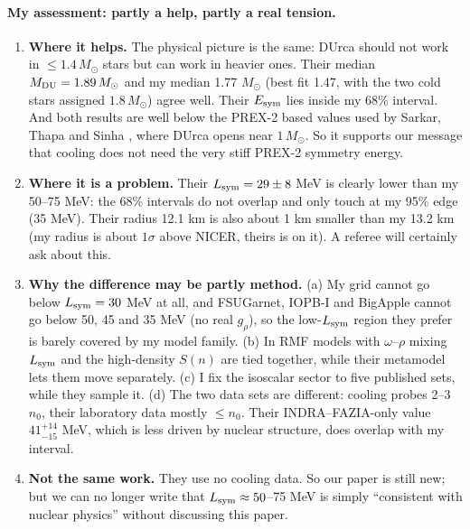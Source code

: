 \documentclass[11pt,a4paper]{article}
\newcommand{\Esym}{E_{\rm sym}}
\newcommand{\Lsym}{L_{\rm sym}}
\newcommand{\Msun}{M_\odot}
\begin{document}
\paragraph{My assessment: partly a help, partly a real tension.}
\begin{enumerate}
\item \textbf{Where it helps.} The physical picture is the same: DUrca should not work in $\le1.4\,\Msun$ stars but can work in heavier ones. Their median $M_{\rm DU}=1.89\,\Msun$ and my median 1.77 $\Msun$ (best fit 1.47, with the two cold stars assigned $1.8\,\Msun$) agree well. Their $\Esym$ lies inside my 68\% interval. And both results are well below the PREX-2 based values used by Sarkar, Thapa and Sinha \cite{Sarkar2023}, where DUrca opens near $1\,\Msun$. So it supports our message that cooling does not need the very stiff PREX-2 symmetry energy.
\item \textbf{Where it is a problem.} Their $\Lsym=29\pm8$ MeV is clearly lower than my 50--75 MeV: the 68\% intervals do not overlap and only touch at my 95\% edge (35 MeV). Their radius 12.1 km is also about 1 km smaller than my 13.2 km (my radius is about $1\sigma$ above NICER, theirs is on it). A referee will certainly ask about this.
\item \textbf{Why the difference may be partly method.} (a) My grid cannot go below $\Lsym=30$ MeV at all, and FSUGarnet, IOPB-I and BigApple cannot go below 50, 45 and 35 MeV (no real $g_\rho$), so the low-$\Lsym$ region they prefer is barely covered by my model family. (b) In RMF models with $\omega$--$\rho$ mixing $\Lsym$ and the high-density $S(n)$ are tied together, while their metamodel lets them move separately. (c) I fix the isoscalar sector to five published sets, while they sample it. (d) The two data sets are different: cooling probes 2--3 $n_0$, their laboratory data mostly $\le n_0$. Their INDRA--FAZIA-only value $41^{+14}_{-15}$ MeV, which is less driven by nuclear structure, does overlap with my interval.
\item \textbf{Not the same work.} They use no cooling data. So our paper is still new; but we can no longer write that $\Lsym\approx50$--75 MeV is simply ``consistent with nuclear physics'' without discussing this paper.
\end{enumerate}
\end{document}

